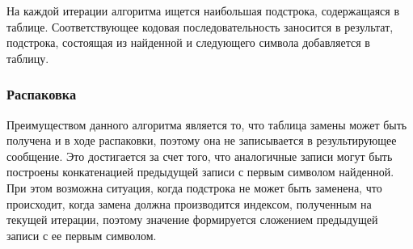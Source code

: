 На каждой итерации алгоритма ищется наибольшая подстрока, содержащаяся
в таблице. Соответствующее кодовая последовательность заносится в результат,
подстрока, состоящая из найденной и следующего символа добавляется в таблицу.

\subsubsection{Распаковка}

Преимуществом данного алгоритма является то, что таблица замены может быть
получена и в ходе распаковки, поэтому она не записывается в результирующее
сообщение. Это достигается за счет того, что аналогичные записи могут быть
построены конкатенацией предыдущей записи с первым символом найденной. При
этом возможна ситуация, когда подстрока не может быть заменена, что происходит,
когда замена должна производится индексом, полученным на текущей итерации,
поэтому значение формируется сложением предыдущей записи с ее первым символом.

